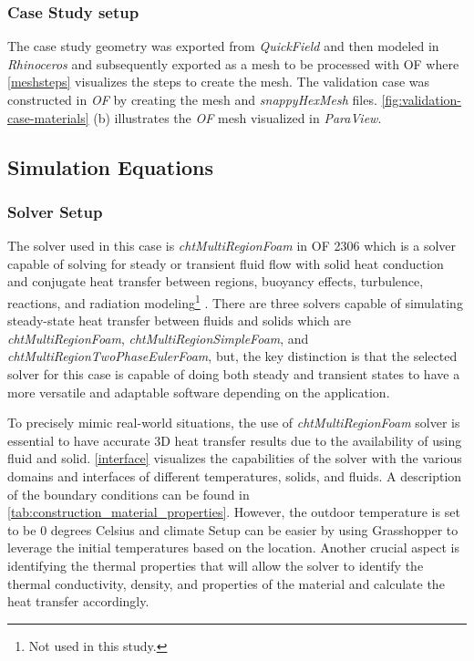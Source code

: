 \subsubsection{Case Study setup}
The case study geometry was exported from \textit{QuickField} and then modeled in \textit{Rhinoceros} and subsequently exported as a mesh to be processed with  \gls{OF} where \ref{meshsteps} visualizes the steps to create the mesh. 
The validation case was constructed in \textit{ \gls{OF}} by creating the mesh and \textit{snappyHexMesh} files.  
\ref{fig:validation-case-materials}  (b) illustrates the \textit{\gls{OF}} mesh visualized in \textit{ParaView}.
    



\subsection{Simulation Equations}

\subsubsection{Solver Setup}
The solver used in this case is \textit{chtMultiRegionFoam} in  \gls{OF} 2306 which is a solver capable of solving for steady or transient fluid flow with solid heat conduction and conjugate heat transfer between regions, buoyancy effects, turbulence, reactions, and radiation modeling\footnote{Not used in this study.} \cite{cht}.
There are three solvers capable of simulating steady-state heat transfer between fluids and solids which are \textit{chtMultiRegionFoam}, \textit{chtMultiRegionSimpleFoam}, and \textit{chtMultiRegionTwoPhaseEulerFoam}, but, the key distinction is that the selected solver for this case is capable of doing both steady and transient states to have a more versatile and adaptable software depending on the application. 


To precisely mimic real-world situations, the use of \textit{ chtMultiRegionFoam} solver is essential to have accurate 3D heat transfer results due to the availability of using fluid and solid. \cref{interface} visualizes the capabilities of the solver with the various domains and interfaces of different temperatures, solids, and fluids. 
A description of the boundary conditions can be found in \cref{tab:construction_material_properties}. 
However, the outdoor temperature is set to be 0 degrees Celsius and climate Setup can be easier by using Grasshopper to leverage the initial temperatures based on the location. 
Another crucial aspect is identifying the thermal properties that will allow the solver to identify the thermal conductivity, density, and properties of the material and calculate the heat transfer accordingly.

